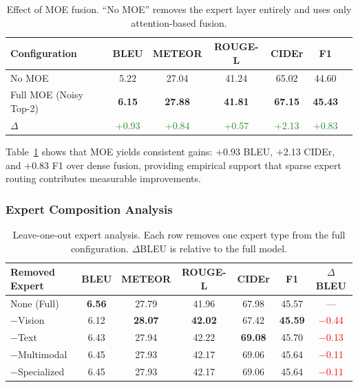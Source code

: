 \begin{table}[t]
\centering
\caption{Effect of MOE fusion. ``No MOE'' removes the expert layer entirely and uses only attention-based fusion.}
\label{tab:ablation_moe}
\begin{tabular}{lcccccc}
\toprule
Configuration & BLEU & METEOR & ROUGE-L & CIDEr & F1 \\
\midrule
No MOE                  & 5.22 & 27.04 & 41.24 & 65.02 & 44.60 \\
Full MOE (Noisy Top-2)  & \textbf{6.15} & \textbf{27.88} & \textbf{41.81} & \textbf{67.15} & \textbf{45.43} \\
\midrule
$\Delta$ & \textcolor{ForestGreen}{+0.93} & \textcolor{ForestGreen}{+0.84} & \textcolor{ForestGreen}{+0.57} & \textcolor{ForestGreen}{+2.13} & \textcolor{ForestGreen}{+0.83} \\
\bottomrule
\end{tabular}
\end{table}

Table~\ref{tab:ablation_moe} shows that MOE yields consistent gains: $+$0.93 BLEU, $+$2.13 CIDEr, and $+$0.83 F1 over dense fusion, providing empirical support that sparse expert routing contributes measurable improvements.

\subsubsection{Expert Composition Analysis}
\label{sec:experiments:ablation:loo}

\begin{table}[t]
\centering
\caption{Leave-one-out expert analysis. Each row removes one expert type from the full configuration. $\Delta$BLEU is relative to the full model.}
\label{tab:ablation_loo}
\begin{tabular}{lcccccc}
\toprule
Removed Expert & BLEU & METEOR & ROUGE-L & CIDEr & F1 & $\Delta$BLEU \\
\midrule
None (Full)     & \textbf{6.56} & 27.79 & 41.96 & 67.98 & 45.57 & --- \\
$-$Vision       & 6.12 & \textbf{28.07} & \textbf{42.02} & 67.42 & \textbf{45.59} & \textcolor{red}{$-$0.44} \\
$-$Text         & 6.43 & 27.94 & 42.22 & \textbf{69.08} & 45.70 & \textcolor{red}{$-$0.13} \\
$-$Multimodal   & 6.45 & 27.93 & 42.17 & 69.06 & 45.64 & \textcolor{red}{$-$0.11} \\
$-$Specialized  & 6.45 & 27.93 & 42.17 & 69.06 & 45.64 & \textcolor{red}{$-$0.11} \\
\bottomrule
\end{tabular}
\end{table}

